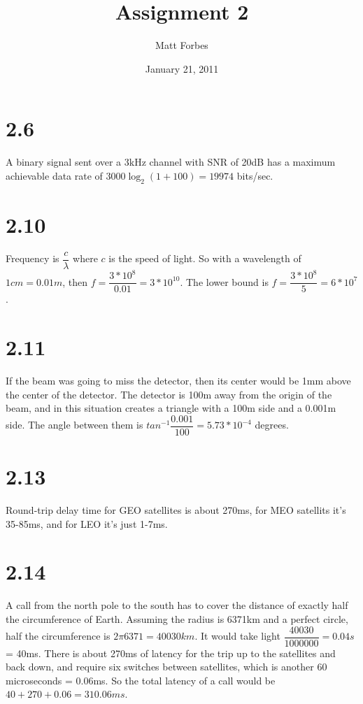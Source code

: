 \documentclass[a4paper,12pt]{article}
\begin{document}
\title{Assignment 2}
\author{Matt Forbes}
\date{January 21, 2011}
\maketitle

\section*{2.6}
A binary signal sent over a 3kHz channel with SNR of 20dB has a
maximum achievable data rate of $3000\log_2(1+100) = 19974$ bits/sec.
\section*{2.10}
Frequency is $\dfrac{c}{\lambda}$ where $c$ is the speed of light. So
with a wavelength of $1cm = 0.01m$, then $f = \dfrac{3*10^8}{0.01} =
3*10^{10}$. The lower bound is $f = \dfrac{3*10^8}{5} = 6*10^7$.
\section*{2.11}
If the beam was going to miss the detector, then its center would be
1mm above the center of the detector. The detector is 100m away from
the origin of the beam, and in this situation creates a triangle with
a 100m side and a 0.001m side. The angle between them is
$tan^{-1}\dfrac{0.001}{100} = 5.73*10^{-4}$ degrees.
\section*{2.13}
Round-trip delay time for GEO satellites is about 270ms, for MEO satellits
it's 35-85ms, and for LEO it's just 1-7ms.
\section*{2.14}
A call from the north pole to the south has to cover the distance of
exactly half the circumference of Earth. Assuming the radius is 6371km
and a perfect circle, half the circumference is $2\pi6371 =
40030km$. It would take light $\dfrac{40030}{1000000} = 0.04s$ =
40ms. There is about 270ms of latency for the trip up to the
satellites and back down, and require six switches between satellites,
which is another 60 microseconds = 0.06ms. So the total latency of a
call would be $40 + 270 + 0.06 = 310.06ms$.
\end{document}
